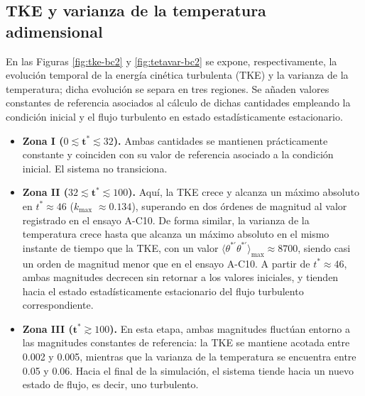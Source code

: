 \subsection{TKE y varianza de la temperatura adimensional}
En las Figuras \ref{fig:tke-bc2} y \ref{fig:tetavar-bc2} se expone, respectivamente, la evolución temporal de la energía cinética turbulenta (TKE) y la varianza de la temperatura; dicha evolución se separa en tres regiones. Se añaden valores constantes de referencia asociados al cálculo de dichas cantidades empleando la condición inicial y el flujo turbulento en estado estadísticamente estacionario.

\begin{itemize}

  \item \textbf{Zona I ($0 \lesssim \mathbf{t^*} \lesssim 32$).} Ambas cantidades se mantienen prácticamente constante y coinciden con su valor de referencia asociado a la condición inicial. El sistema no transiciona.

  \item \textbf{Zona II ($32 \lesssim \mathbf{t^*} \lesssim 100$).} Aquí, la TKE crece y alcanza un máximo absoluto en $t^* \approx 46$ ($k_{\text{max}}$ $\approx 0\text{.}134$), superando en dos órdenes de magnitud al valor registrado en el ensayo A-C10. De forma similar, la varianza de la temperatura crece hasta que alcanza un máximo absoluto en el mismo instante de tiempo que la TKE, con un valor $\langle \theta^{*\prime} \theta^{*\prime}\rangle_{\text{max}} \approx 8700$, siendo casi un orden de magnitud menor que en el ensayo A-C10. A partir de $t^* \approx 46$, ambas magnitudes decrecen sin retornar a los valores iniciales, y tienden hacia el estado estadísticamente estacionario del flujo turbulento correspondiente.

  \item \textbf{Zona III ($\mathbf{t^*} \gtrsim 100$).} En esta etapa, ambas magnitudes fluctúan entorno a las magnitudes constantes de referencia: la TKE se mantiene acotada entre 0.002 y 0.005, mientras que la varianza de la temperatura se encuentra entre 0.05 y 0.06. Hacia el final de la simulación, el sistema tiende hacia un nuevo estado de flujo, es decir, uno turbulento. 

\end{itemize}


